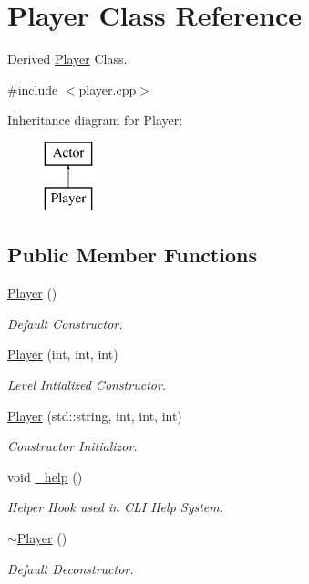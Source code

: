 \hypertarget{classPlayer}{}\section{Player Class Reference}
\label{classPlayer}


Derived \mbox{\hyperlink{classPlayer}{Player}} Class.  




{\ttfamily \#include $<$player.\+cpp$>$}

Inheritance diagram for Player\+:\begin{figure}[H]
\begin{center}
\leavevmode
\includegraphics[height=2.000000cm]{classPlayer}
\end{center}
\end{figure}
\subsection*{Public Member Functions}
\begin{DoxyCompactItemize}
\item 
\mbox{\hyperlink{classPlayer_affe0cc3cb714f6deb4e62f0c0d3f1fd8}{Player}} ()
\begin{DoxyCompactList}\small\item\em Default Constructor. \end{DoxyCompactList}\item 
\mbox{\hyperlink{classPlayer_a47eaddc652e72e30707a8647364fc734}{Player}} (int, int, int)
\begin{DoxyCompactList}\small\item\em Level Intialized Constructor. \end{DoxyCompactList}\item 
\mbox{\hyperlink{classPlayer_abeb2eee0f7cf8bdd9ebbe6d1fb7d7641}{Player}} (std\+::string, int, int, int)
\begin{DoxyCompactList}\small\item\em Constructor Initializor. \end{DoxyCompactList}\item 
\mbox{\label{classPlayer_a84a9ad72d69ce7e49747c1c3d07903c1}} 
void \mbox{\hyperlink{classPlayer_a84a9ad72d69ce7e49747c1c3d07903c1}{\+\_\+help}} ()
\begin{DoxyCompactList}\small\item\em Helper Hook used in C\+LI Help System. \end{DoxyCompactList}\item 
\mbox{\label{classPlayer_a749d2c00e1fe0f5c2746f7505a58c062}} 
\mbox{\hyperlink{classPlayer_a749d2c00e1fe0f5c2746f7505a58c062}{$\sim$\+Player}} ()
\begin{DoxyCompactList}\small\item\em Default Deconstructor. \end{DoxyCompactList}\end{DoxyCompactItemize}
